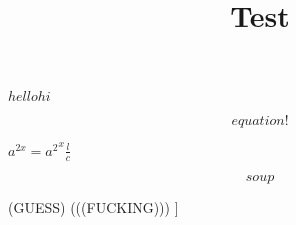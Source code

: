 \documentclass{article}
\title{
  Test
}
\begin{document}
\maketitle


\section{}

\(hello hi\)

\[
  equation!
\]

\(a^{2x} = {a^2}^x \frac{l}{c}\)

\begin{equation*}
\label{eq:2}
  soup
\end{equation*}

\left(GUESS\right)
(((FUCKING)))
\left[W(HA)[T]\right]
\end{document}
